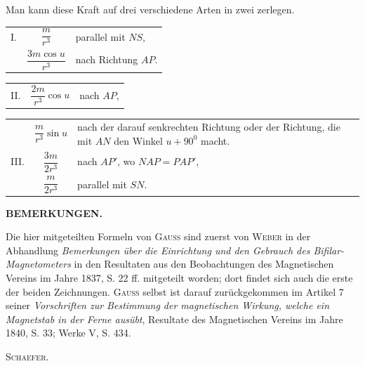\noindent Man kann diese Kraft auf drei verschiedene Arten in zwei zerlegen.
\par\medskip
\noindent\begin{tabular}{@{}p{}cp{}@{}}
I.&\(\dfrac{m}{r^3}\)&parallel mit \(NS\),\\[.6em]
&\(\dfrac{3m\cos u}{r^3}\)&nach Richtung \(AP\).
\end{tabular}\par\smallskip
\noindent{\small [S. 186]}\par\smallskip
\noindent\begin{tabular}{@{}p{}ll@{}}
II.&\(\dfrac{2m}{r^3}\cos u\)&nach \(AP\),
\end{tabular}
\clearpage{}
\noindent\begin{tabular}{@{}p{}cp{}@{}}
&\(\dfrac{m}{r^3}\sin u\)&nach der darauf senkrechten Richtung oder der Richtung, die
mit \(AN\) den Winkel \(u+90^0\) macht.\\[.6em]
III.&\(\dfrac{3m}{2r^3}\)&nach \(AP'\), wo \(NAP=PAP'\),\\[.6em]
&\(\dfrac{m}{2r^3}\)&parallel mit \(SN\).
\end{tabular}
\bigskip\begin{center}\textbf{BEMERKUNGEN.}\end{center}
{\small\noindent\hspace*{\parindent}Die hier mitgeteilten Formeln von \textsc{Gauss} sind zuerst von \textsc{Weber} in der Abhandlung \textit{Bemerkungen
über die Einrichtung und den Gebrauch des Bifilar-Magnetometers} in den Resultaten aus den Beobachtungen
des Magnetischen Vereins im Jahre 1837, S. 22 ff. mitgeteilt worden; dort findet sich auch die
erste der beiden Zeichnungen. \textsc{Gauss} selbst ist darauf zurückgekommen im Artikel 7 seiner \textit{Vorschriften
zur Bestimmung der magnetischen Wirkung, welche ein Magnetstab in der Ferne ausübt}, Resultate des
Magnetischen Vereins im Jahre 1840, S. 33; Werke V, S. 434.
\par\raggedleft\textsc{Schaefer}.\par}
\clearpage\endgroup

